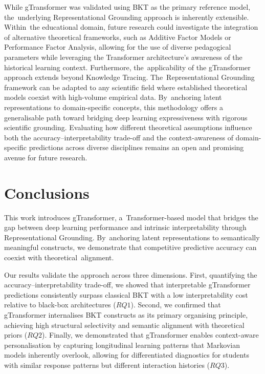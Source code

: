 \documentclass[applsci,article,accept,moreauthors,pdftex]{Definitions/mdpi}
\begin{document}
{While gTransformer was validated using BKT as the primary reference model, the~underlying Representational Grounding approach is inherently extensible. Within~the educational domain, future research could investigate the integration of alternative theoretical frameworks, such as Additive Factor Models or Performance Factor Analysis, allowing for the use of diverse pedagogical parameters while leveraging the Transformer architecture's awareness of the historical learning context. Furthermore, the~applicability of the gTransformer approach extends beyond Knowledge Tracing. The~Representational Grounding framework can be adapted to any scientific field where established theoretical models coexist with high-volume empirical data. By~anchoring latent representations to domain-specific concepts, this methodology offers a {generalisable} path toward bridging deep learning expressiveness with rigorous scientific grounding. Evaluating how different theoretical assumptions influence both the accuracy--interpretability trade-off and the context-awareness of domain-specific predictions across diverse disciplines remains an open and promising avenue for future research.}

\section{Conclusions} \label{sec_conclusions}

This work introduces gTransformer, a~Transformer-based model that bridges the gap between deep learning performance and intrinsic interpretability through Representational Grounding. By~anchoring latent representations to semantically meaningful constructs, we demonstrate that competitive predictive accuracy can coexist with theoretical~alignment.

Our results validate the approach across three dimensions. First, quantifying the accuracy--interpretability trade-off, we showed that interpretable gTransformer predictions consistently surpass classical BKT with a low interpretability cost relative to black-box architectures ($RQ1$). Second, we confirmed that gTransformer {internalises} BKT constructs as its primary {organising} principle, achieving high structural selectivity and semantic alignment with theoretical priors ($RQ2$). Finally, we demonstrated that gTransformer enables context-aware {personalisation} by capturing longitudinal learning patterns that Markovian models inherently overlook, allowing for differentiated diagnostics for students with similar response patterns but different interaction histories ($RQ3$).
\end{document}
